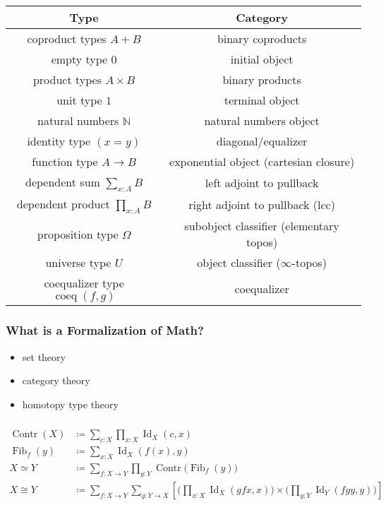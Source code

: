 \documentclass[UTF8,11pt,colorlinks,compress,openany]{beamer}%
\begin{document}
\begin{frame}\frametitle{}
\centering
\begin{tabu}{c|c}
 \hline
 \textbf{Type} & \textbf{Category}\\
 \hline
 coproduct types $A+B$ & binary coproducts\\
 empty type $0$ & initial object\\
 product types $A\times B$ & binary products\\
 unit type $1$ & terminal object\\
 natural numbers $\mathbb{N}$ & natural numbers object\\
 identity type $(x=y)$ & diagonal/equalizer\\
 function type $A\to B$ & exponential object (cartesian closure)\\
 dependent sum $\sum_{x:A} B$ & left adjoint to pullback\\
 dependent product $\prod_{x:A} B$ & right adjoint to pullback (lcc)\\
 proposition type $\Omega$ & subobject classifier (elementary topos)\\
 universe type $U$ & object classifier ($\infty$-topos)\\
 coequalizer type $\operatorname{coeq}(f,g)$ & coequalizer\\
 \hline
\end{tabu}
\end{frame}

\begin{frame}\frametitle{What is a Formalization of Math?}
\begin{itemize}
	\item set theory
	\item category theory
	\item homotopy type theory
\end{itemize}
\end{frame}

\begin{frame}\frametitle{}
\begin{align*}
\operatorname{Contr}(X)&\coloneqq \sum_{c:X}\prod_{x:X}\operatorname{Id}_X(c,x)\\
\operatorname{Fib}_f(y)&\coloneqq \sum_{x:X}\operatorname{Id}_X(f(x),y)\\
X\simeq Y&\coloneqq\sum_{f:X\to Y}\prod_{y:Y} \operatorname{Contr}\big(\operatorname{Fib}_f(y)\big)\\
X\cong Y&\coloneqq\sum_{f:X\to Y}\sum_{g:Y\to X}\left[\bigg(\prod_{x:X} \operatorname{Id}_X(gfx,x)\bigg)\times\bigg(\prod_{y:Y} \operatorname{Id}_Y(fgy,y)\bigg)\right]
\end{align*}
\end{frame}
\end{document}

